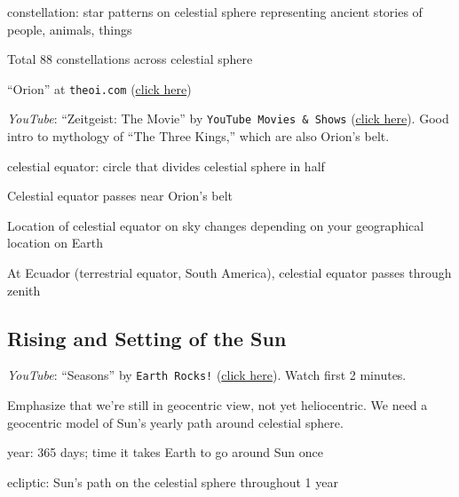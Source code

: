\documentclass{article}
\begin{document}
\hgraydashline

\gls{constellation}: star patterns on celestial sphere representing ancient stories of people, animals, things

Total 88 constellations across celestial sphere

 ``Orion'' at \texttt{theoi.com} (\href{https://www.theoi.com/Gigante/GiganteOrion.html}{click here})

 \textit{YouTube}: ``Zeitgeist: The Movie'' by \texttt{YouTube Movies \& Shows} (\href{https://youtu.be/xM6LXDQXMUw?t=900}{click here}). Good intro to mythology of ``The Three Kings,'' which are also Orion's belt.

\gls{celestial equator}: circle that divides celestial sphere in half

Celestial equator passes near Orion's belt

Location of celestial equator on sky changes depending on your geographical location on Earth

At Ecuador (terrestrial equator, South America), celestial equator passes through zenith

\hgraydashline

\subsection*{Rising and Setting of the Sun}

 \textit{YouTube}: ``Seasons'' by \texttt{Earth Rocks!} (\href{https://youtu.be/tX3Y5bzNDiU}{click here}). Watch first 2 minutes.

{\color{lightgray} Emphasize that we're still in geocentric view, not yet heliocentric. We need a geocentric model of Sun's yearly path around celestial sphere.}

\gls{year}: 365 days; time it takes Earth to go around Sun once

\gls{ecliptic}: Sun's path on the celestial sphere throughout 1 year
\end{document}
